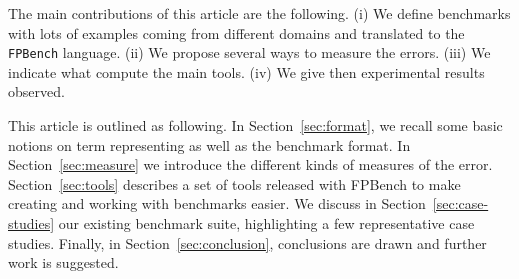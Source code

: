 \documentclass[main.tex]{subfiles}
\begin{document}
The main contributions of this article are the following.
(i) We define benchmarks with lots of examples coming from different domains and translated to the \texttt{FPBench} language. 
(ii) We propose several ways to measure the errors. 
(iii) We indicate what compute the main tools. 
(iv) We give then experimental results observed. 


This article is outlined as following. In Section~\ref{sec:format}, we
recall some basic notions on term representing as well as the
benchmark format. In Section~\ref{sec:measure} we introduce the
different kinds of measures of the error. Section~\ref{sec:tools}
describes a set of tools released with FPBench to make creating and
working with benchmarks easier. We discuss in
Section~\ref{sec:case-studies} our existing benchmark suite,
highlighting a few representative case studies. Finally, in
Section~\ref{sec:conclusion}, conclusions are drawn and further work
is suggested.





%
%
%
%
%
\end{document}
